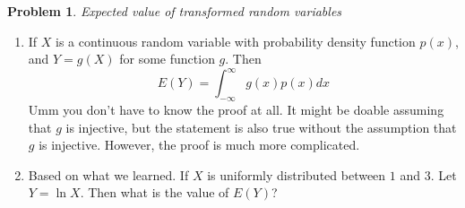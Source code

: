 \documentclass[11pt,oneside]{amsart}
\theoremstyle{definition}
\newtheorem{problem}{Problem}
\begin{document}
    \begin{problem} \textit{Expected value of transformed random variables}
    \newline
    \begin{enumerate}
        \item If $X$ is a continuous random variable with probability density function $p(x)$, and $Y=g(X)$ for some function $g$. Then 
        $$
        E(Y)=\int_{-\infty}^\infty g(x)p(x) dx   
        $$
    Umm you don't have to know the proof at all. It might be doable assuming that $g$ is injective, but the statement is also true without the assumption that $g$ is injective. However, the proof is much more complicated.
        \item Based on what we learned. If $X$ is uniformly distributed between $1$ and $3$. Let $Y=\ln X$. Then what is the value of $E(Y)$?
    \end{enumerate}
    \end{problem}
\end{document}
